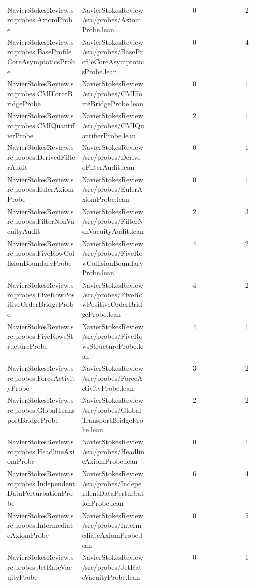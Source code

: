 \begin{longtable}{p{0.30\linewidth}p{0.28\linewidth}rr}
NavierStokesReview.src.probes.AxiomProbe & NavierStokesReview/src/probes/AxiomProbe.lean & 0 & 2\\
NavierStokesReview.src.probes.BaseProfileCoreAsymptoticsProbe & NavierStokesReview/src/probes/BaseProfileCoreAsymptoticsProbe.lean & 0 & 4\\
NavierStokesReview.src.probes.CMIForceBridgeProbe & NavierStokesReview/src/probes/CMIForceBridgeProbe.lean & 0 & 1\\
NavierStokesReview.src.probes.CMIQuantifierProbe & NavierStokesReview/src/probes/CMIQuantifierProbe.lean & 2 & 1\\
NavierStokesReview.src.probes.DerivedFilterAudit & NavierStokesReview/src/probes/DerivedFilterAudit.lean & 0 & 1\\
NavierStokesReview.src.probes.EulerAxiomProbe & NavierStokesReview/src/probes/EulerAxiomProbe.lean & 0 & 1\\
NavierStokesReview.src.probes.FilterNonVacuityAudit & NavierStokesReview/src/probes/FilterNonVacuityAudit.lean & 2 & 3\\
NavierStokesReview.src.probes.FiveRowCollisionBoundaryProbe & NavierStokesReview/src/probes/FiveRowCollisionBoundaryProbe.lean & 4 & 2\\
NavierStokesReview.src.probes.FiveRowPositiveOrderBridgeProbe & NavierStokesReview/src/probes/FiveRowPositiveOrderBridgeProbe.lean & 4 & 2\\
NavierStokesReview.src.probes.FiveRowsStructureProbe & NavierStokesReview/src/probes/FiveRowsStructureProbe.lean & 4 & 1\\
NavierStokesReview.src.probes.ForceActivityProbe & NavierStokesReview/src/probes/ForceActivityProbe.lean & 3 & 2\\
NavierStokesReview.src.probes.GlobalTransportBridgeProbe & NavierStokesReview/src/probes/GlobalTransportBridgeProbe.lean & 2 & 2\\
NavierStokesReview.src.probes.HeadlineAxiomProbe & NavierStokesReview/src/probes/HeadlineAxiomProbe.lean & 0 & 1\\
NavierStokesReview.src.probes.IndependentDataPerturbationProbe & NavierStokesReview/src/probes/IndependentDataPerturbationProbe.lean & 6 & 4\\
NavierStokesReview.src.probes.IntermediateAxiomProbe & NavierStokesReview/src/probes/IntermediateAxiomProbe.lean & 0 & 5\\
NavierStokesReview.src.probes.JetRateVacuityProbe & NavierStokesReview/src/probes/JetRateVacuityProbe.lean & 0 & 1\\

\end{longtable}
